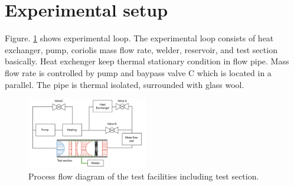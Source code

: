 \documentclass[conference]{IEEEtran}
\begin{document}
\section{Experimental setup}
Figure. \ref{experimental_loop} shows experimental loop.
The experimental loop consists of heat exchanger, pump, coriolis mass flow rate, welder, reservoir, and test section basically.
Heat exchenger keep thermal stationary condition in flow pipe.
Mass flow rate is controlled by pump and baypass valve C which is located in a parallel.
The pipe is thermal isolated, surrounded with glass wool.\\

\begin{figure}[htbp]
\centering
\vspace{-4zh}
\includegraphics[width=0.47\textwidth,natwidth=920,natheight=700]{fig/experimental_loop.png}
\caption{Process flow diagram of the test facilities including test section.}
\label{experimental_loop}
\end{figure}
\end{document}
